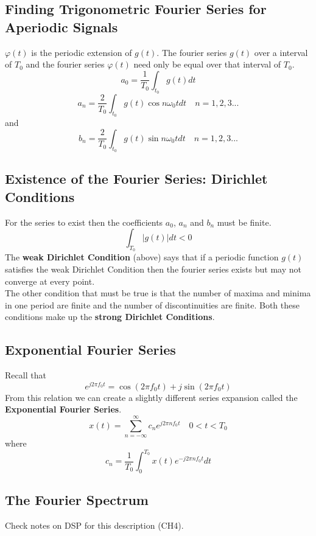 \documentclass{article}
\begin{document}
    \subsection{Finding Trigonometric Fourier Series for Aperiodic Signals}
    $\varphi(t)$ is the periodic extension of $g(t)$. The fourier series $g(t)$ over a interval of $T_0$ and the fourier series $\varphi(t)$ need only be
    equal over that interval of $T_0$.
    \begin{equation}
        a_0 = \frac{1}{T_0}\int_{t_0} g(t)dt
    \end{equation}
    \begin{equation}
        a_n = \frac{2}{T_0}\int_{t_0} g(t)\cos n\omega_0tdt \quad n=1,2,3...
    \end{equation}
    and 
    \begin{equation}
        b_n = \frac{2}{T_0}\int_{t_0} g(t)\sin n\omega_0tdt \quad n=1,2,3...
    \end{equation}

    \subsection{Existence of the Fourier Series: Dirichlet Conditions}
    For the series to exist then the coefficients $a_0$, $a_n$ and $b_n$ must be finite.
    \begin{equation}
        \int_{T_0}|g(t)|dt < 0
    \end{equation}
    The \textbf{weak Dirichlet Condition} (above) says that if a periodic function $g(t)$ satisfies the weak Dirichlet Condition then the fourier series
    exists but may not converge at every point. \\
    The other condition that must be true is that the number of maxima and minima in one period are finite and the number of discontinuities are finite. Both
    these conditions make up the \textbf{strong Dirichlet Conditions}.

    \subsection{Exponential Fourier Series}
    Recall that
    \begin{equation}
        e^{j2\pi f_0t} = \cos(2\pi f_0t) + j\sin(2\pi f_0 t)
    \end{equation}
    From this relation we can create a slightly different series expansion called the \textbf{Exponential Fourier Series}.
    \begin{equation}
        x(t) = \sum_{n=-\infty}^{\infty}c_n e^{j2\pi nf_0t} \quad 0 < t < T_0
    \end{equation}
    where 
    \begin{equation}
        c_n = \frac{1}{T_0}\int_{0}^{T_0}x(t)e^{-j2\pi n f_0t}dt
    \end{equation}

    \subsection{The Fourier Spectrum}
    Check notes on DSP for this description (CH4).

    
\end{document}
